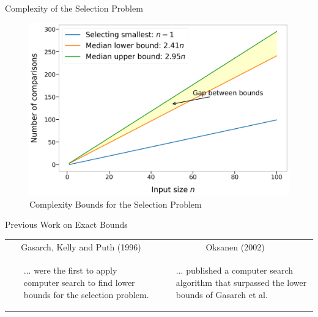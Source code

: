 \begin{frame}{Complexity of the Selection Problem}
  \begin{figure}
    \includegraphics[height=0.65\textheight]{figures/bounds_diagram.png}
    \caption{Complexity Bounds for the Selection Problem}
  \end{figure}
\end{frame}

\begin{frame}{Previous Work on Exact Bounds}
  \begin{tabular}{|p{6cm}|p{6cm}|}
    \hline
    \multicolumn{1}{|c|}{Gasarch, Kelly and Puth (1996)}                                               & \multicolumn{1}{c|}{Oksanen (2002)} \\
    \cline{1-2}
    \raggedright \begin{itemize}
                   \item [...]were the first to apply computer search to find lower bounds for the selection problem.
                 \end{itemize} &
    \begin{itemize}
      \item[...] published a computer search algorithm that surpassed the lower bounds of Gasarch et al.
    \end{itemize}                                        \\
    \cline{1-2}
  \end{tabular}

\end{frame}

